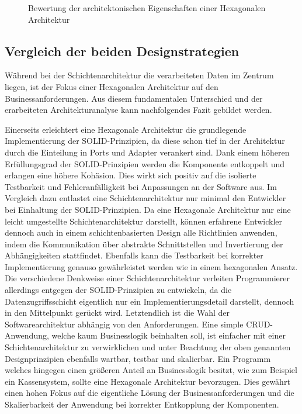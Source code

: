 \documentclass[conference]{IEEEtran}
\begin{document}
\begin{figure}[htbp]
	
	\caption{Bewertung der architektonischen Eigenschaften einer Hexagonalen Architektur}	
	\label{fig:HexagonaleArchitekturBewertung}
\end{figure}

\subsection{Vergleich der beiden Designstrategien}

Während bei der Schichtenarchitektur die verarbeiteten Daten im Zentrum liegen, ist der Fokus einer Hexagonalen Architektur auf den Businessanforderungen. Aus diesem fundamentalen Unterschied und der erarbeiteten Architekturanalyse kann nachfolgendes Fazit gebildet werden. 

Einerseits erleichtert eine Hexagonale Architektur die grundlegende Implementierung der SOLID-Prinzipien, da diese schon tief in der Architektur durch die Einteilung in Ports und Adapter verankert sind. Dank einem höheren Erfüllungsgrad der SOLID-Prinzipien werden die Komponente entkoppelt und erlangen eine höhere Kohäsion. Dies wirkt sich positiv auf die isolierte Testbarkeit und Fehleranfälligkeit bei Anpassungen an der Software aus. Im Vergleich dazu entlastet eine Schichtenarchitektur nur minimal den Entwickler bei Einhaltung der SOLID-Prinzipien. Da eine Hexagonale Architektur nur eine leicht umgestellte Schichtenarchitektur darstellt, können erfahrene Entwickler dennoch auch in einem schichtenbasierten Design alle Richtlinien anwenden, indem die Kommunikation über abstrakte Schnittstellen und Invertierung der Abhängigkeiten stattfindet. Ebenfalls kann die Testbarkeit bei korrekter Implementierung genauso gewährleistet werden wie in einem hexagonalen Ansatz. Die verschiedene Denkweise einer Schichtenarchitektur verleiten Programmierer allerdings entgegen der SOLID-Prinzipien zu entwickeln, da die Datenzugriffsschicht eigentlich nur ein Implementierungsdetail darstellt, dennoch in den Mittelpunkt gerückt wird. \cite{layer.solid} Letztendlich ist die Wahl der Softwarearchitektur abhängig von den Anforderungen. Eine simple CRUD-Anwendung, welche kaum Businesslogik beinhalten soll, ist einfacher mit einer Schichtenarchitektur zu verwirklichen und unter Beachtung der oben genannten Designprinzipien ebenfalls wartbar, testbar und skalierbar. Ein Programm welches hingegen einen größeren Anteil an Businesslogik besitzt, wie zum Beispiel ein Kassensystem, sollte eine Hexagonale Architektur bevorzugen. Dies gewährt einen hohen Fokus auf die eigentliche Lösung der Businessanforderungen und die Skalierbarkeit der Anwendung bei korrekter Entkopplung der Komponenten.


\printbibliography
\end{document}

